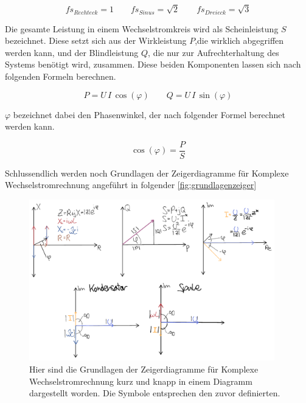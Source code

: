 \documentclass[11pt,ngerman]{scrartcl}
\begin{document}
\begin{equation}
	fs_{Rechteck} = 1 \qquad fs_{Sinus} = \sqrt{2} \qquad fs_{Dreieck} = \sqrt{3}
	\label{eq:fss}
\end{equation}

Die gesamte Leistung in einem Wechselstromkreis wird als Scheinleistung $S$
bezeichnet. Diese setzt sich aus der Wirkleistung $P$,die wirklich abgegriffen
werden kann, und der Blindleistung $Q$, die nur zur Aufrechterhaltung des
Systems benötigt wird, zusammen. Diese beiden Komponenten lassen sich nach
folgenden Formeln berechnen.

\begin{equation}
	P = U \,I \,\cos(\varphi) \qquad  Q = U \,I \,\sin(\varphi)
	\label{eq:Wirk&Blindleistung}
\end{equation}

$\varphi$ bezeichnet dabei den Phasenwinkel, der nach folgender Formel berechnet
werden kann. \cite{deimel2015grundlagen} \cite{demtroder2018ex2}

\begin{equation}
	\cos(\varphi) = \frac{P}{S}
	\label{eq:phi}
\end{equation}

Schlussendlich werden noch Grundlagen der Zeigerdiagramme für Komplexe Wechselstromrechnung angeführt in folgender \autoref{fig:grundlagenzeiger}


\begin{figure}[H]
	\begin{center}
		\includegraphics[width=0.95\textwidth]{./figures/grundlagen_zeiger.pdf}
	\end{center}
	\caption{Hier sind die Grundlagen der Zeigerdiagramme für Komplexe
		Wechselstromrechnung kurz und knapp in einem Diagramm dargestellt worden. Die
		Symbole entsprechen den zuvor definierten. \cite{gerthsen}}
	\label{fig:grundlagenzeiger}
\end{figure}
\vspace{5mm}
\end{document}
